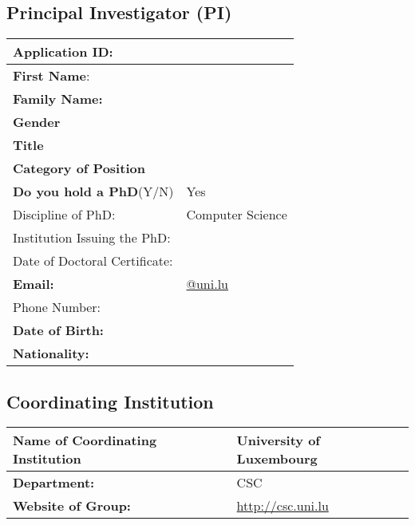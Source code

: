 %

\subsection{Principal Investigator (PI)}

\begin{table}[H]
    \centering\small
    \begin{tabular}{|p{}|p{}|}
        \hline
        Application ID:        & \\\hline
        \textbf{First Name}:   &  \\\hline
        \textbf{Family Name:}  & \\\hline
        \textbf{Gender}        & \\\hline
        \textbf{Title}         & \\\hline
        \textbf{Category of Position}   & \\\hline
        \textbf{Do you hold a PhD}(Y/N) & Yes\\
        \hfill Discipline of PhD:              & Computer Science \\
        \hfill Institution Issuing the PhD:    & \\
        \hfill Date of Doctoral Certificate:   & \\\hline
        \textbf{Email:}& \url{@uni.lu}\\\hline
        Phone Number:          & \\\hline 
        \textbf{Date of Birth:}& \\\hline
        \textbf{Nationality:}  & \\\hline
        \hline
    \end{tabular}
\end{table}

\subsection{Coordinating Institution}

\begin{center}
    \small
    \begin{tabular}{|l|l|}
        \hline
        \textbf{Name of Coordinating Institution} & University of Luxembourg \\\hline
        \textbf{Department:}                      & CSC \\\hline
        \textbf{Website of Group:}                & \url{http://csc.uni.lu} \\\hline
    \end{tabular}
\end{center}




%
